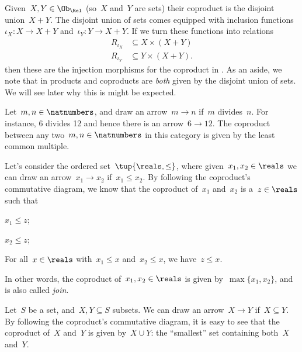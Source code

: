 \begin{example}
  Given~$X,Y\in \Ob_\Rel$ (so~$X$ and~$Y$ are sets) their coproduct is the disjoint union~$X+Y$. The disjoint union of sets comes equipped with inclusion functions~$\iota_X\colon X\to X+Y$ and~$\iota_Y\colon Y\to X+Y$. If we turn these functions into relations
  \begin{equation*}
    \begin{aligned}
      R_{\iota_X}&\subseteq X\times (X+Y)\\
      R_{\iota_Y}&\subseteq Y\times (X+Y).
    \end{aligned}
  \end{equation*}
  then these are the injection morphisms for the coproduct in \Rel.
  As an aside, we note that in \Rel products and coproducts are \emph{both} given by the disjoint union of sets. We will see later why this is might be expected.
\end{example}

\begin{example}
  Let~$m,n\in \natnumbers$, and draw an arrow~$m\to n$ if~$m$ divides~$n$. For instance, 6 divides 12 and hence there is an arrow~$6\to 12$. The coproduct between any two~$m,n\in \natnumbers$ in this category is given by the least common multiple.
\end{example}

\begin{example}
  Let's consider the ordered set~$\tup{\reals,\leq}$, where given~$x_1,x_2\in \reals$ we can draw an arrow~$x_1\to x_2$ if~$x_1\leq x_2$. By following the coproduct's commutative diagram, we know that the coproduct of~$x_1$ and~$x_2$ is a~$z\in \reals$ such that
  \begin{compactitem}
    \item $x_1\leq z$;
    \item $x_2\leq z$;
    \item For all~$x\in \reals$ with~$x_1\leq x$ and~$x_2\leq x$, we have~$z\leq x$.
  \end{compactitem}
  In other words, the coproduct of~$x_1,x_2\in \reals$ is given by~$\max\{x_1,x_2\}$, and is also called \emph{join}.
\end{example}

\begin{example}
  \label{ex:subset_coprod}
  Let~$S$ be a set, and~$X,Y\subseteq S$ subsets. We can draw an arrow~$X\to Y$ if~$X\subseteq Y$. By following the coproduct's commutative diagram, it is easy to see that the coproduct of~$X$ and~$Y$ is given by~$X\cup Y$: the ``smallest'' set containing both~$X$ and~$Y$.
\end{example}



